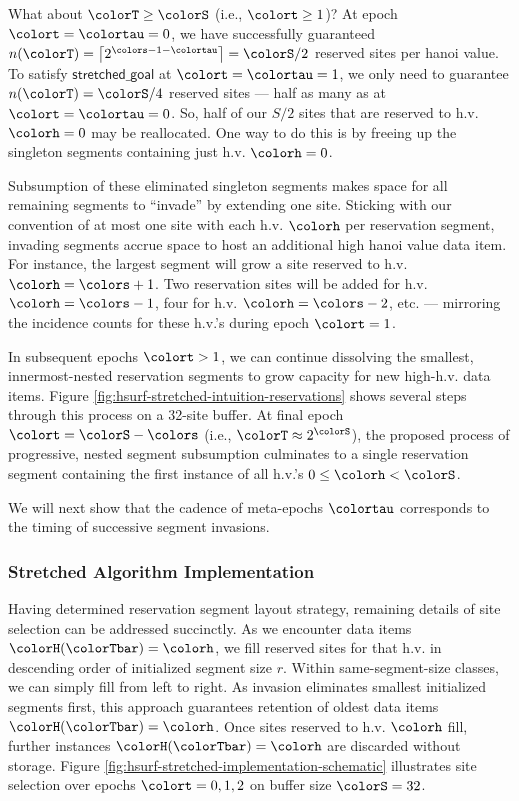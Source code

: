What about $\colorT \geq \colorS$ (i.e., $\colort \geq 1$)?
At epoch $\colort=\colortau=0$, we have successfully guaranteed $n(\colorT) = \left\lceil2^{\colors - 1 - \colortau}\right\rceil = \colorS / 2$ reserved sites per hanoi value.
To satisfy $\textsf{stretched\_goal}$ at $\colort=\colortau=1$, we only need to guarantee $n(\colorT) = \colorS/4$ reserved sites --- half as many as at $\colort=\colortau=0$.
So, half of our $S/2$ sites that are reserved to h.v. $\colorh=0$ may be reallocated.
One way to do this is by freeing up the singleton segments containing just h.v. $\colorh=0$.

Subsumption of these eliminated singleton segments makes space for all remaining segments to ``invade'' by extending one site.
Sticking with our convention of at most one site with each h.v. $\colorh$ per reservation segment, invading segments accrue space to host an additional high hanoi value data item.
For instance, the largest segment will grow a site reserved to h.v. $\colorh=\colors +1$.
Two reservation sites will be added for h.v. $\colorh=\colors - 1$, four for h.v. $\colorh=\colors - 2$, etc. --- mirroring the incidence counts for these h.v.'s during epoch $\colort=1$.

In subsequent epochs $\colort>1$, we can continue dissolving the smallest, innermost-nested reservation segments to grow capacity for new high-h.v. data items.
Figure \ref{fig:hsurf-stretched-intuition-reservations} shows several steps through this process on a 32-site buffer.
At final epoch $\colort=\colorS-\colors$ (i.e., $\colorT \approx 2^{\colorS}$), the proposed process of progressive, nested segment subsumption culminates to a single reservation segment containing the first instance of all h.v.'s $0 \leq \colorh < \colorS$.

We will next show that the cadence of meta-epochs $\colortau$ corresponds to the timing of successive segment invasions.





\subsubsection{Stretched Algorithm Implementation}
\label{sec:stretched-implementation}

Having determined reservation segment layout strategy, remaining details of site selection can be addressed succinctly.
As we encounter data items $\colorH(\colorTbar) = \colorh$, we fill reserved sites for that h.v. in descending order of initialized segment size $r$.
Within same-segment-size classes, we can simply fill from left to right.
As invasion eliminates smallest initialized segments first, this approach guarantees retention of oldest data items $\colorH(\colorTbar) = \colorh$.
Once sites reserved to h.v. $\colorh$ fill, further instances $\colorH(\colorTbar) = \colorh$ are discarded without storage.
Figure \ref{fig:hsurf-stretched-implementation-schematic} illustrates site selection over epochs $\colort=0,1,2$ on buffer size $\colorS=32$.

